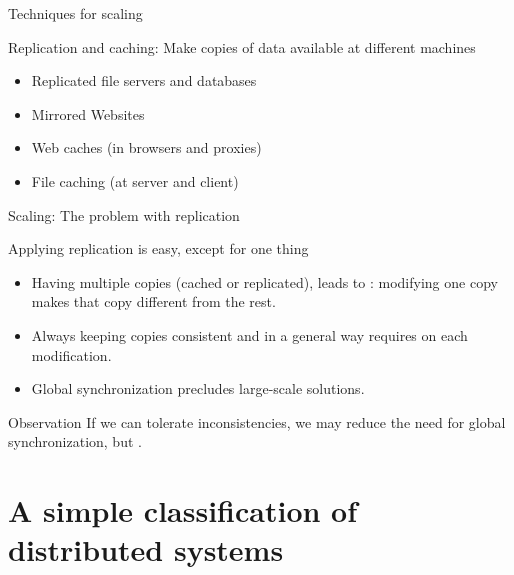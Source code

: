 \begin{slide}{Techniques for scaling} 
  \begin{block}{Replication and caching: Make copies of data available at different machines}
    \begin{itemize}
    \item Replicated file servers and databases
    \item Mirrored Websites
    \item Web caches (in browsers and proxies)
    \item File caching (at server and client)
    \end{itemize}
  \end{block}
\end{slide}
\begin{slide}{Scaling: The problem with replication}
  \begin{block}{Applying replication is easy, except for one thing}
    \begin{itemize}
	\item Having multiple copies (cached or replicated), leads to : modifying one copy
      makes that copy different from the rest.
	\item Always keeping copies consistent and in a general way requires  on
      each modification.
	\item Global synchronization precludes large-scale solutions.
    \end{itemize}
  \end{block}
  \onslide
  \begin{block}{Observation}
    If we can tolerate inconsistencies, we may reduce the need for global synchronization, but    
    .
  \end{block}
\end{slide}
\section{A simple classification of distributed systems}
